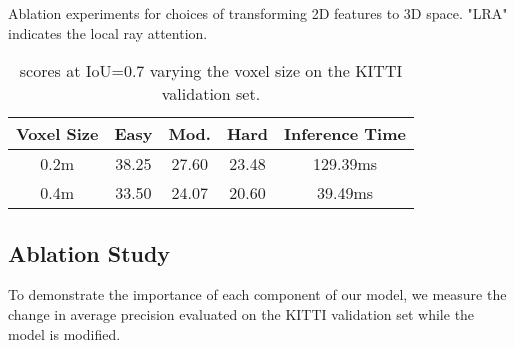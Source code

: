 \documentclass[10pt,twocolumn,letterpaper]{article}
\begin{document}
\begin{table}
{  }
  \caption{Ablation experiments for choices of transforming 2D features to 3D space. "LRA" indicates the local ray attention.}
  \label{tab:local_ray_attention}
\end{table} \begin{table}
  \centering
  \caption{ /  results for pedestrians at IoU = 0.5.}
  \label{tab:pedestrian_results}
\end{table} \begin{table}
  \centering
  \begin{tabular}{ccccc}
    \toprule
    Voxel Size & Easy & Mod. & Hard & Inference Time \\
    \midrule
    0.2m & 38.25 & 27.60 & 23.48 & 129.39ms \\
    0.4m & 33.50 & 24.07 & 20.60 & 39.49ms \\
    \bottomrule
  \end{tabular}
  \caption{ scores at IoU=0.7 varying the voxel size on the KITTI validation set.}
  \label{tab:inference time}
\end{table} 
\subsection{Ablation Study}
To demonstrate the importance of each component of our model, we measure the change in average precision evaluated on the KITTI validation set while the model is modified.
\end{document}
